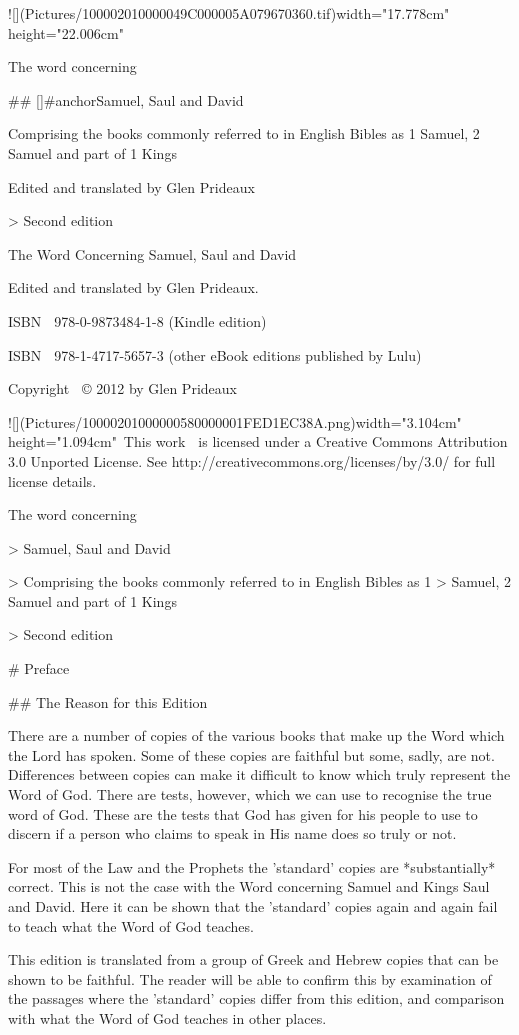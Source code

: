 ![](Pictures/100002010000049C000005A079670360.tif){width="17.778cm"
height="22.006cm"}

The word concerning

## []{#anchor}Samuel, Saul and David

Comprising the books commonly referred to in English Bibles as 1 Samuel,
2 Samuel and part of 1 Kings

Edited and translated by Glen Prideaux

> Second edition

The Word Concerning Samuel, Saul and David

Edited and translated by Glen Prideaux.

ISBNﾠ978-0-9873484-1-8 (Kindle edition)

ISBNﾠ978-1-4717-5657-3 (other eBook editions published by Lulu)

Copyrightﾠ© 2012 by Glen Prideaux

![](Pictures/10000201000000580000001FED1EC38A.png){width="3.104cm"
height="1.094cm"}\
This workﾠis licensed under a Creative Commons Attribution 3.0 Unported
License. See http://creativecommons.org/licenses/by/3.0/ for full
license details.

The word concerning

> Samuel, Saul and David

> Comprising the books commonly referred to in English Bibles as 1
> Samuel, 2 Samuel and part of 1 Kings

> Second edition

# Preface

## The Reason for this Edition

There are a number of copies of the various books that make up the Word
which the Lord has spoken. Some of these copies are faithful but some,
sadly, are not. Differences between copies can make it difficult to know
which truly represent the Word of God. There are tests, however, which
we can use to recognise the true word of God. These are the tests that
God has given for his people to use to discern if a person who claims to
speak in His name does so truly or not.

For most of the Law and the Prophets the 'standard' copies are
*substantially* correct. This is not the case with the Word concerning
Samuel and Kings Saul and David. Here it can be shown that the
'standard' copies again and again fail to teach what the Word of God
teaches.

This edition is translated from a group of Greek and Hebrew copies that
can be shown to be faithful. The reader will be able to confirm this by
examination of the passages where the 'standard' copies differ from this
edition, and comparison with what the Word of God teaches in other
places.

